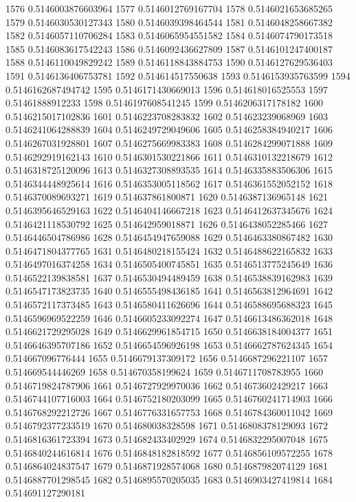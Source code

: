 1576 0.5146003876603964
1577 0.5146012769167704
1578 0.5146021653685265
1579 0.5146030530127343
1580 0.5146039398464544
1581 0.5146048258667382
1582 0.5146057110706284
1583 0.5146065954551582
1584 0.5146074790173518
1585 0.5146083617542243
1586 0.5146092436627809
1587 0.5146101247400187
1588 0.5146110049829242
1589 0.5146118843884753
1590 0.5146127629536403
1591 0.5146136406753781
1592 0.514614517550638
1593 0.5146153935763599
1594 0.5146162687494742
1595 0.5146171430669013
1596 0.514618016525553
1597 0.51461888912233
1598 0.5146197608541245
1599 0.5146206317178182
1600 0.5146215017102836
1601 0.5146223708283832
1602 0.514623239068969
1603 0.5146241064288839
1604 0.5146249729049606
1605 0.5146258384940217
1606 0.5146267031928801
1607 0.5146275669983383
1608 0.5146284299071888
1609 0.5146292919162143
1610 0.5146301530221866
1611 0.5146310132218679
1612 0.5146318725120096
1613 0.5146327308893535
1614 0.5146335883506306
1615 0.5146344448925614
1616 0.5146353005118562
1617 0.5146361552052152
1618 0.5146370089693271
1619 0.514637861800871
1620 0.5146387136965148
1621 0.5146395646529163
1622 0.5146404146667218
1623 0.5146412637345676
1624 0.5146421118530792
1625 0.514642959018871
1626 0.5146438052285466
1627 0.5146446504786986
1628 0.5146454947659088
1629 0.5146463380867482
1630 0.5146471804377765
1631 0.5146480218155424
1632 0.5146488622165832
1633 0.5146497016374258
1634 0.5146505400745851
1635 0.5146513775245649
1636 0.5146522139838581
1637 0.5146530494489459
1638 0.5146538839162983
1639 0.5146547173823735
1640 0.5146555498436185
1641 0.5146563812964691
1642 0.5146572117373485
1643 0.5146580411626696
1644 0.5146588695688323
1645 0.5146596969522259
1646 0.5146605233092274
1647 0.5146613486362018
1648 0.5146621729295028
1649 0.5146629961854715
1650 0.5146638184004377
1651 0.5146646395707186
1652 0.5146654596926198
1653 0.5146662787624345
1654 0.514667096776444
1655 0.5146679137309172
1656 0.5146687296221107
1657 0.514669544446269
1658 0.514670358199624
1659 0.5146711708783955
1660 0.5146719824787906
1661 0.5146727929970036
1662 0.514673602429217
1663 0.5146744107716003
1664 0.5146752180203099
1665 0.5146760241714903
1666 0.5146768292212726
1667 0.5146776331657753
1668 0.5146784360011042
1669 0.5146792377233519
1670 0.514680038328598
1671 0.5146808378129093
1672 0.5146816361723394
1673 0.514682433402929
1674 0.5146832295007048
1675 0.5146840244616814
1676 0.5146848182818592
1677 0.5146856109572255
1678 0.5146864024837547
1679 0.5146871928574068
1680 0.514687982074129
1681 0.5146887701298545
1682 0.5146895570205035
1683 0.5146903427419814
1684 0.514691127290181
